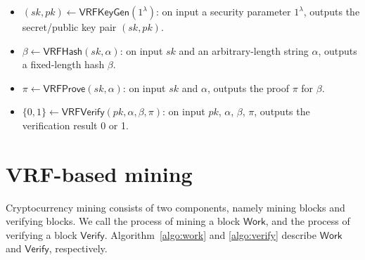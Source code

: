 \documentclass[a0,portrait]{a0poster}
\begin{document}
\begin{multicols}{2}
    \begin{itemize}
        \item $(sk, pk) \gets \mathsf{VRFKeyGen}(1^{\lambda})$: on input a security parameter $1^{\lambda}$, outputs the secret/public key pair $(sk, pk)$.
        \item $\beta \gets \mathsf{VRFHash}(sk, \alpha)$: on input $sk$ and an arbitrary-length string $\alpha$, outputs a fixed-length hash $\beta$.
        \item $\pi \gets \mathsf{VRFProve}(sk, \alpha)$: on input $sk$ and $\alpha$, outputs the proof $\pi$ for $\beta$.
        \item $\{0, 1\} \gets \mathsf{VRFVerify}(pk, \alpha, \beta, \pi)$: on input $pk$, $\alpha$, $\beta$, $\pi$, outputs the verification result 0 or 1.
    \end{itemize}






    \section*{VRF-based mining}

    Cryptocurrency mining consists of two components, namely mining blocks and verifying blocks.
    We call the process of mining a block $\mathsf{Work}$, and the process of verifying a block $\mathsf{Verify}$.
    Algorithm~\ref{algo:work} and \ref{algo:verify} describe $\mathsf{Work}$ and $\mathsf{Verify}$, respectively.


\end{multicols}
\end{document}
